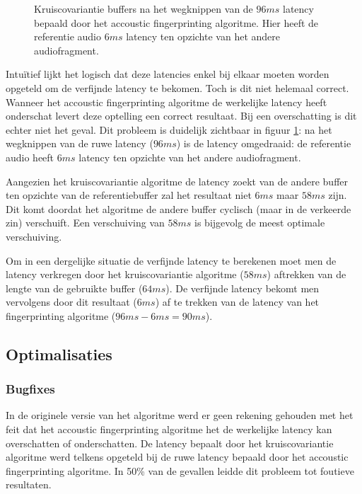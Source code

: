 \begin{figure}[h!]
	\captionsetup{width=0.7\textwidth}
	\caption[Kruiscovariantie buffers]{Kruiscovariantie buffers na het wegknippen van de $ 96 ms $ latency bepaald door het accoustic fingerprinting algoritme. Hier heeft de referentie audio $ 6 ms $ latency ten opzichte van het andere audiofragment.   }
	\begin{center}
		\advance\parskip0.3cm
		
	\end{center}
	\label{crosscovariance2}
\end{figure}

Intuïtief lijkt het logisch dat deze latencies enkel bij elkaar moeten worden opgeteld om de verfijnde latency te bekomen. Toch is dit niet helemaal correct. Wanneer het accoustic fingerprinting algoritme de werkelijke latency heeft onderschat levert deze optelling een correct resultaat. Bij een overschatting is dit echter niet het geval. Dit probleem is duidelijk zichtbaar in figuur \ref{crosscovariance2}: na het wegknippen van de ruwe latency ($96 ms$) is de latency omgedraaid: de referentie audio heeft $ 6 ms $ latency ten opzichte van het andere audiofragment. 

Aangezien het kruiscovariantie algoritme de latency zoekt van de andere buffer ten opzichte van de referentiebuffer zal het resultaat niet $6 ms$ maar $ 58 ms $ zijn. Dit komt doordat het algoritme de andere buffer cyclisch (maar in de verkeerde zin) verschuift. Een verschuiving van $ 58 ms $ is bijgevolg de meest optimale verschuiving.

Om in een dergelijke situatie de verfijnde latency te berekenen moet men de latency verkregen door het kruiscovariantie algoritme ($ 58 ms$) aftrekken van de lengte van de gebruikte buffer ($ 64 ms $). De verfijnde latency bekomt men vervolgens door dit resultaat ($ 6 ms $) af te trekken van de latency van het fingerprinting  algoritme ($ 96 ms - 6 ms = 90 ms $).


\subsection{Optimalisaties}

\subsubsection{Bugfixes}

In de originele versie van het algoritme werd er geen rekening gehouden met het feit dat het accoustic fingerprinting algoritme het de werkelijke latency kan overschatten of onderschatten. De latency bepaalt door het kruiscovariantie algoritme werd telkens opgeteld bij de ruwe latency bepaald door het accoustic fingerprinting algoritme. In 50\% van de gevallen leidde dit probleem tot foutieve resultaten.

